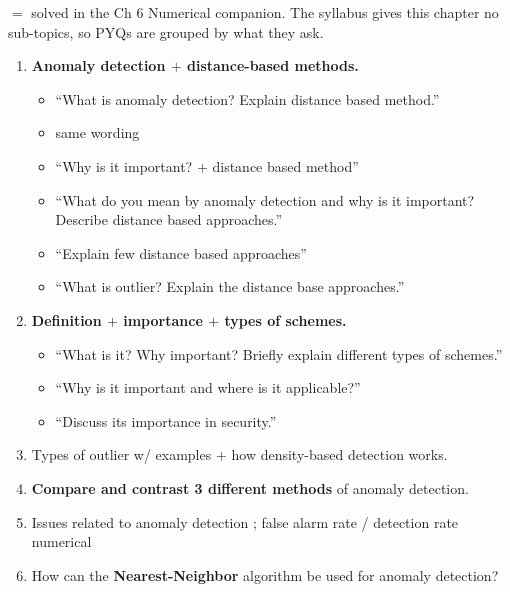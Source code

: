 \hr


{\color{sub}\footnotesize {} $=$ solved in the Ch 6 Numerical companion.
The syllabus gives this chapter no sub-topics, so PYQs are grouped by what they ask.}

\begin{enumerate}
  \item {} \textbf{Anomaly detection $+$ distance-based methods.} 
  \begin{itemize}
    \item ``What is anomaly detection? Explain distance based method.'' \hfill {} 
    \item same wording \hfill {} 
    \item ``Why is it important? $+$ distance based method'' \hfill {} 
    \item ``What do you mean by anomaly detection and why is it important? Describe distance based approaches.'' \hfill {} 
    \item ``Explain few distance based approaches'' \hfill {} 
    \item ``What is outlier? Explain the distance base approaches.'' \hfill {} 
  \end{itemize}
  \item {} \textbf{Definition $+$ importance $+$ types of schemes.}
  \begin{itemize}
    \item ``What is it? Why important? Briefly explain different types of schemes.'' \hfill {} 
    \item ``Why is it important and where is it applicable?'' \hfill {} 
    \item ``Discuss its importance in security.'' \hfill {} 
  \end{itemize}
  \item {} Types of outlier w/ examples $+$ how density-based detection works. \hfill {} 
  \item {} \textbf{Compare and contrast 3 different methods} of anomaly detection. \hfill {} 
  \item {} Issues related to anomaly detection \hfill {} ;
         false alarm rate / detection rate numerical \hfill {} 
  \item {} How can the \textbf{Nearest-Neighbor} algorithm be used for anomaly detection? \hfill {} 

\end{enumerate}
